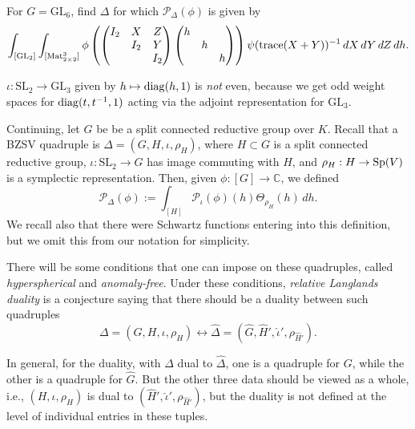 \documentclass[reqno]{amsart} 
\numberwithin{theorem}{section}
\numberwithin{equation}{section}
\numberwithin{exercise}{section}
\begin{document}
\begin{exercise}\label{exercise:cq6tho3oca}
  For $G = \mathrm{GL}_6$, find $\Delta$ for which $\mathcal{P}_\Delta(\phi)$ is given by
  \begin{equation*}
    \int_{[\mathrm{GL}_2]} \int_{[\operatorname{Mat}_{2 \times 2}^3]} \phi
    \left(
      \begin{pmatrix}
        I_2      & X & Z \\
                 & I_2 & Y \\
                 &  & I_2 \\
      \end{pmatrix}
      \begin{pmatrix}
        h      &  &  \\
               & h &  \\
               &  & h \\
      \end{pmatrix}\right)
    \psi(\operatorname{trace}(X + Y))^{-1}
    \, d X \, d Y \, d Z \, d h.
  \end{equation*}
\end{exercise}

\begin{example}\label{example:cq6tho3m7k}
  $\iota : \mathrm{SL}_2 \rightarrow \mathrm{GL}_3$ given by $h \mapsto \operatorname{diag}(h, 1)$ is \emph{not} even, because we get odd weight spaces for $\operatorname{diag}(t, t^{-1}, 1)$ acting via the adjoint representation for $\mathrm{GL}_3$.
\end{example}

Continuing, let $G$ be be a split connected reductive group over $K$.  Recall that a BZSV quadruple is $\Delta =(G, H, \iota, \rho_H)$, where $H \subset G$ is a split connected reductive group, $\iota : \mathrm{SL}_2 \rightarrow G$ has image commuting with $H$, and $\rho_H : H \rightarrow \operatorname{Sp}(V)$ is a symplectic representation.  Then, given $\phi :[G] \rightarrow \mathbb{C}$, we defined
\begin{equation*}
  \mathcal{P}_\Delta(\phi) := \int_{[H]} \mathcal{P}_\iota(\phi)(h) \Theta_{\rho_H}(h) \, d h.
\end{equation*}
We recall also that there were Schwartz functions entering into this definition, but we omit this from our notation for simplicity.

There will be some conditions that one can impose on these quadruples, called \emph{hyperspherical} and \emph{anomaly-free}.  Under these conditions, \emph{relative Langlands duality} is a conjecture saying that there should be a duality between such quadruples
\begin{equation}\label{eq:cq6txrs6zo}
  \Delta =(G, H, \iota, \rho_H) \leftrightarrow
  \hat{\Delta} =
  (\hat{G}, \hat{H}', \hat{\iota}', \rho_{\hat{H}'}).
\end{equation}
\begin{remark}\label{remark:cq6txru6kw}
  In general, for the duality, with $\Delta$ dual to $\hat{\Delta}$, one is a quadruple for $G$, while the other is a quadruple for $\hat{G}$.  But the other three data should be viewed as a whole, i.e., $(H, \iota, \rho_H)$ is dual to $(\hat{H}', \hat{\iota}', \rho_{\hat{H}'})$, but the duality is not defined at the level of individual entries in these tuples.
\end{remark}
\end{document}
